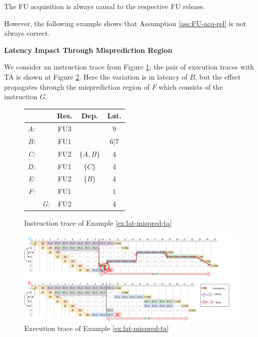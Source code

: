 
\begin{assumption}
The FU acquisition is always causal to the respective FU release.
\label{ass:FU-acq-rel}
\end{assumption}

However, the following example shows that Assumption \ref{ass:FU-acq-rel} is not always correct. 

\begin{example}
\textbf{Latency Impact Through Misprediction Region}

We consider an instruction trace from Figure \ref{fig:lat-mispred-ta-input}; the pair of execution traces with TA is shown at Figure \ref{fig:lat-mispred-ta-trace}. Here the variation is in latency of $B$, but the effect propagates through the misprediction region of $F$ which consists of the instruction $G$. 
\label{ex:lat-mispred-ta}
\end{example}


\begin{figure}[H]
    \centering
    \begin{tabular}{rr|ccc}
    &  & Res. & Dep. & Lat. \\ \hline
    \textit{A:} &  & FU3 &  & $9$ \\
    \textit{B:} &  & FU1 &  & $6|7$ \\
    \textit{C:} &  & FU2 & $\{A, B\}$ & $4$ \\
    \textit{D:} &  & FU1 & $\{C\}$ & $4$ \\
    \textit{E:} &  & FU2 & $\{B\}$ & $4$ \\
    \textit{F:} &  & FU1 &  & $1$ \\
    & \textit{G:} & FU2 &  & $4$ \\
    \end{tabular}
    \caption{Instruction trace of Example \ref{ex:lat-mispred-ta}}
    \label{fig:lat-mispred-ta-input}
\end{figure}


\begin{figure}[H]
    \centering
    \includegraphics[width=\textwidth]{figures/lat-mispred.png}
    \caption{Execution trace of Example \ref{ex:lat-mispred-ta}}
    \label{fig:lat-mispred-ta-trace}
\end{figure}

